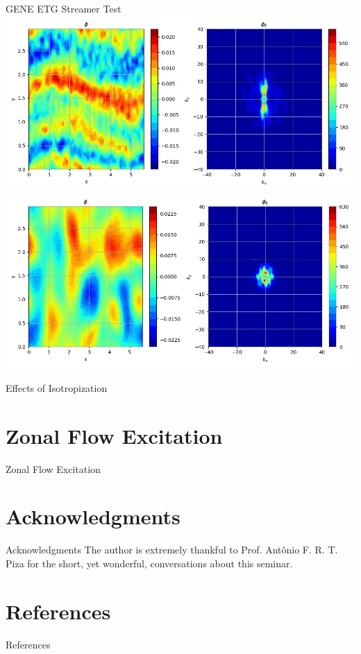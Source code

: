 \documentclass[aspectratio=43]{beamer}
\begin{document}
   \begin{frame}{GENE ETG Streamer Test}
      \includegraphics[height=.4\textheight,width=.8\textwidth]{Images/hmETG_geneInit.png}
      \includegraphics[height=.4\textheight,width=.8\textwidth]{Images/hmETG_geneIso.png}
   \end{frame}

   \begin{frame}{Effects of Isotropization}
      
   \end{frame}

   \section{Zonal Flow Excitation}

   \begin{frame}{Zonal Flow Excitation}
   \end{frame}
   
   \section*{Acknowledgments} %
      \begin{frame}{Acknowledgments}
          The author is extremely thankful to Prof. Antônio F. R. T. Piza for the short, yet wonderful, conversations about this seminar.
      \end{frame}
   
   \section*{References}
      \begin{frame}{References}
      \end{frame}
\end{document}
